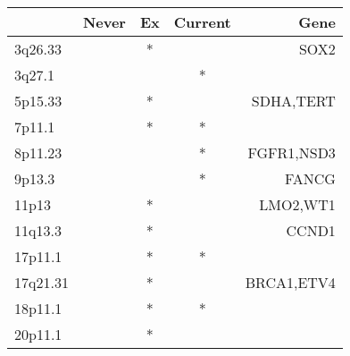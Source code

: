 \begin{tabular}{lcccr}
\toprule
{} & Never & Ex & Current &        Gene \\
\midrule
3q26.33  &       &  * &         &        SOX2 \\
3q27.1   &       &    &       * &             \\
5p15.33  &       &  * &         &   SDHA,TERT \\
7p11.1   &       &  * &       * &             \\
8p11.23  &       &    &       * &  FGFR1,NSD3 \\
9p13.3   &       &    &       * &       FANCG \\
11p13    &       &  * &         &    LMO2,WT1 \\
11q13.3  &       &  * &         &       CCND1 \\
17p11.1  &       &  * &       * &             \\
17q21.31 &       &  * &         &  BRCA1,ETV4 \\
18p11.1  &       &  * &       * &             \\
20p11.1  &       &  * &         &             \\
\bottomrule
\end{tabular}
